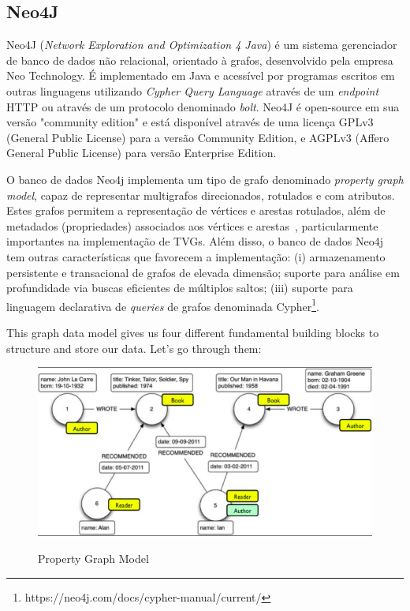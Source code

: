 \subsection{Neo4J}

Neo4J (\emph{Network Exploration and Optimization 4 Java}) é um sistema gerenciador de banco de dados não relacional, orientado à grafos, desenvolvido pela empresa Neo Technology. É implementado em Java e acessível por programas escritos em outras linguagens utilizando \emph{Cypher Query Language} através de um \emph{endpoint} HTTP ou através de um protocolo denominado \emph{bolt}.
Neo4J é open-source em sua versão "community edition" e está disponível através de uma licença  GPLv3 (General Public License) para a versão Community Edition, e AGPLv3 (Affero General Public License) para versão Enterprise Edition.

O banco de dados Neo4j implementa um tipo de grafo denominado \emph{property graph model}, capaz de representar multigrafos direcionados, rotulados e com atributos. Estes grafos permitem a representação de vértices e arestas rotulados, além de metadados (propriedades) associados aos vértices e arestas~\cite{rod:10}, particularmente importantes na implementação de TVGs. Além disso, o banco de dados Neo4j tem outras características que favorecem a implementação: (i) armazenamento persistente e transacional de grafos de elevada dimensão; suporte para análise em profundidade via buscas eficientes de múltiplos saltos; (iii) suporte para linguagem declarativa de \emph{queries} de grafos denominada Cypher\footnote{https://neo4j.com/docs/cypher-manual/current/}.


This graph data model gives us four different fundamental building blocks to
structure and store our data. Let's go through them:


 \begin{figure}[!h]
 \caption{Property Graph Model}
     \centering
     \includegraphics[scale=.60]{./Capitulo3/img/grafo-rotulado.png}
         \label{fig:propertygraphmodel}
 \end{figure}
 


